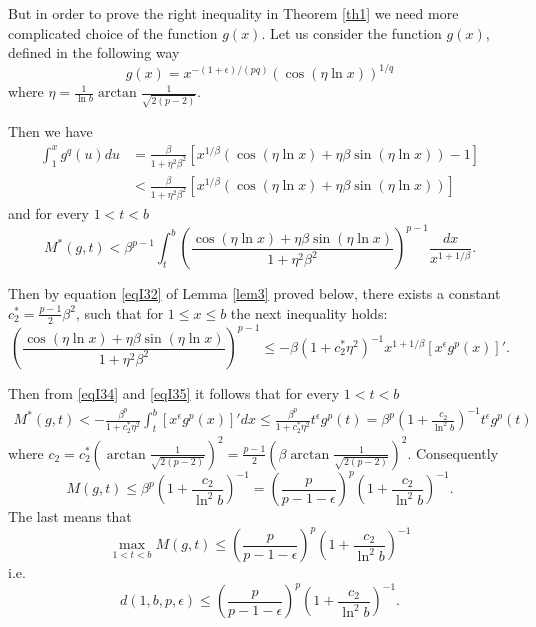 \documentclass{amsart}
\theoremstyle{definition}
\theoremstyle{remark}
\numberwithin{equation}{section}
\begin{document}
But in order to prove the right inequality in Theorem \ref{th1} we need more complicated choice
of the function $g(x)$.
Let us consider the function $g(x)$, defined in the following way
\begin{equation*}\label{eq200}
g(x)=x^{-(1+\epsilon)/(pq)}\left(\cos(\eta\ln x) \right)^{1/q}
\end{equation*}
where $\eta=\frac{1}{\ln b}\arctan{\frac{1}{\sqrt{2(p-2)}}}$.

 Then we have
\begin{align*}
\int_1^xg^q(u)du&=\frac{\beta}{1+\eta^2\beta^2}\left[x^{1/\beta}(\cos(\eta\ln x)+\eta \beta\sin(\eta\ln x))-1 \right]\\
&<\frac{\beta}{1+\eta^2\beta^2}\left[x^{1/\beta}(\cos(\eta\ln x)+\eta \beta\sin(\eta\ln x))\right]\end{align*}
and for every $1< t< b$
\begin{equation}\label{eqI34}
M^*(g,t)<\beta^{p-1}\int_t^b\left(\frac{\cos(\eta\ln x)+\eta \beta\sin(\eta\ln x)}{1+\eta^2\beta^2} \right)^{p-1}
\frac{dx}{x^{1+1/\beta}}.
\end{equation}


Then by equation \eqref{eqI32} of Lemma \ref{lem3} proved below, there exists a constant $c_2^*= \frac{p-1}{2}\beta^2$, %
 such that for $1\le x\le b$
the next inequality holds:
\begin{equation}\label{eqI35}
\left(\frac{\cos(\eta\ln x)+\eta \beta\sin(\eta\ln x)}{1+\eta^2\beta^2} \right)^{p-1}\le
-\beta\left(1+c_2^*\eta^2 \right)^{-1}x^{1+1/\beta}\left[x^\epsilon g^p(x) \right]'.
\end{equation}

Then from  \eqref{eqI34} and  \eqref{eqI35} it follows that for every $1< t< b$
\begin{align*}
M^*(g,t)<-\frac{\beta^p}{1+c_2^*\eta^2}\int_t^b\left[x^\epsilon g^p(x) \right]'dx
\le \frac{\beta^p}{1+c_2^*\eta^2}t^\epsilon g^p(t)=\beta^p\left(1+\frac{c_2}{\ln^2b}\right)^{-1}t^\epsilon g^p(t)
\end{align*}
where $c_2=c_2^*\left(\arctan{\frac{1}{\sqrt{2(p-2)}}}\right)^2 = \frac{p-1}{2}\left(\beta\arctan{\frac{1}{\sqrt{2(p-2)}}}\right)^2$.
Consequently 
\[
M(g,t)\le  \beta^p\left(1+\frac{c_2}{\ln^2b}\right)^{-1}
=\left(\frac{p}{p-1-\epsilon} \right)^p  \left(1+\frac{c_2}{\ln^2 b}\right)^{-1}.
\]
The last means that 
\[
\max_{1< t< b}M(g,t)\le 
\left(\frac{p}{p-1-\epsilon} \right)^p  \left(1+\frac{c_2}{\ln^2 b}\right)^{-1}
\]
i.e.
\[
 d(1,b,p,\epsilon)\le \left(\frac{p}{p-1-\epsilon} \right)^p  \left(1+\frac{c_2}{\ln^2 b}\right)^{-1}.
\]
\end{document}
